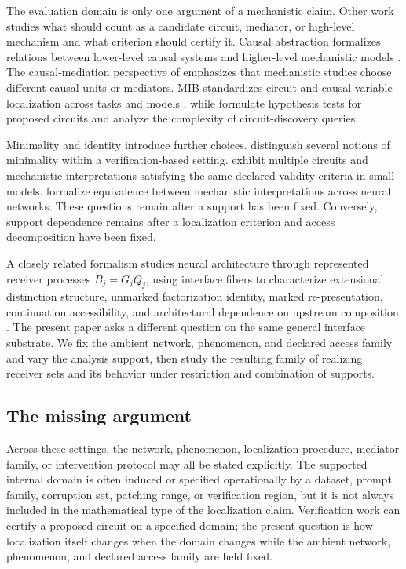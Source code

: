The evaluation domain is only one argument of a mechanistic claim. Other work studies what should count as a candidate circuit, mediator, or high-level mechanism and what criterion should certify it. Causal abstraction formalizes relations between lower-level causal systems and higher-level mechanistic models \citep{geiger2025causal}. The causal-mediation perspective of \citet{mueller2026mediator} emphasizes that mechanistic studies choose different causal units or mediators. MIB standardizes circuit and causal-variable localization across tasks and models \citep{mueller2025mib}, while \citet{shi2024hypothesis} formulate hypothesis tests for proposed circuits and \citet{adolfi2025complexity} analyze the complexity of circuit-discovery queries.

Minimality and identity introduce further choices. \citet{hadad2026formal} distinguish several notions of minimality within a verification-based setting. \citet{meloux2025identifiable} exhibit multiple circuits and mechanistic interpretations satisfying the same declared validity criteria in small models. \citet{sun2026equivalent} formalize equivalence between mechanistic interpretations across neural networks. These questions remain after a support has been fixed. Conversely, support dependence remains after a localization criterion and access decomposition have been fixed.

A closely related formalism studies neural architecture through represented receiver processes $B_j=G_jQ_j$, using interface fibers to characterize extensional distinction structure, unmarked factorization identity, marked re-presentation, continuation accessibility, and architectural dependence on upstream composition \citep{rosariofreytes2026architecture}. The present paper asks a different question on the same general interface substrate. We fix the ambient network, phenomenon, and declared access family and vary the analysis support, then study the resulting family of realizing receiver sets and its behavior under restriction and combination of supports.

\subsection{The missing argument}

Across these settings, the network, phenomenon, localization procedure, mediator family, or intervention protocol may all be stated explicitly. The supported internal domain is often induced or specified operationally by a dataset, prompt family, corruption set, patching range, or verification region, but it is not always included in the mathematical type of the localization claim. Verification work can certify a proposed circuit on a specified domain; the present question is how localization itself changes when the domain changes while the ambient network, phenomenon, and declared access family are held fixed.

